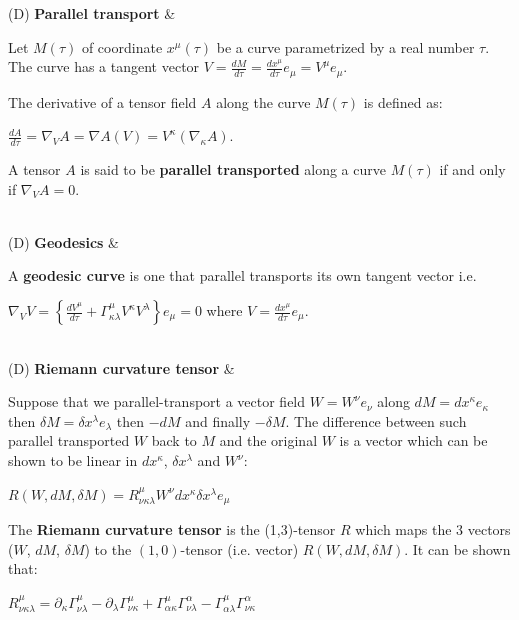 \documentclass[11pt]{article}
\newcommand{\toshDefinition}[2]		{\hline (D) {\bf{#1}} & {#2} \\}
\begin{document}
\toshDefinition{Parallel transport}{Let $M(\tau)$ of coordinate $x^\mu(\tau)$ be a curve parametrized by a real number $\tau$. The curve has a tangent vector $V=\frac{dM}{d\tau}=\frac{dx^\mu}{d\tau}e_\mu=V^\mu e_\mu$.

The derivative of a tensor field $A$ along the curve $M(\tau)$ is defined as:

\quad $\displaystyle \frac{d A}{d\tau}=\nabla_V A=\nabla A (V)=V^\kappa (\nabla_\kappa A)$.

A tensor $A$ is said to be \textbf{parallel transported} along a curve $M(\tau)$ if and only if $\nabla_V A=0$.
}
\toshDefinition{Geodesics}{A \textbf{geodesic curve} is one that parallel transports its own tangent vector  i.e. 
	
\quad $\displaystyle \nabla_V V=\left\{\frac{dV^\mu}{d\tau}+\Gamma^\mu_{\kappa \lambda}V^\kappa V^\lambda\right\}	e_\mu=0$ \quad where \quad $\displaystyle V=\frac{dx^\mu}{d\tau}e_\mu$.
}
\toshDefinition{Riemann curvature tensor}{Suppose that we parallel-transport a vector field $W=W^\nu e_\nu$ along $dM=dx^\kappa e_\kappa$ then $\delta M = \delta x^\lambda e_\lambda$ then $ - dM$ and finally $-\delta M$. The difference between such parallel transported $W$ back to $M$ and the original $W$ is a vector which can be shown to be linear in $dx^\kappa$, $\delta x^\lambda$ and $W^\nu$:

\smallskip

\quad $R(W,dM,\delta M)	= R^\mu_{\nu \kappa\lambda}W^\nu dx^\kappa \delta x^\lambda e_\mu$

\smallskip

The \textbf{Riemann curvature tensor} is the (1,3)-tensor $R$ which maps the 3 vectors ($W$, $dM$, $\delta M$) to the $(1,0)$-tensor (i.e. vector) $R(W,dM,\delta M)$. 
It can be shown that:

\smallskip

\quad $\displaystyle R^\mu_{\nu\kappa\lambda}=\partial_\kappa\Gamma^\mu_{\nu\lambda}-\partial_\lambda\Gamma^\mu_{\nu\kappa}+\Gamma^\mu_{\alpha\kappa}\Gamma^\alpha_{\nu\lambda}-\Gamma^\mu_{\alpha\lambda}\Gamma^\alpha_{\nu\kappa}$

}
\end{document}
